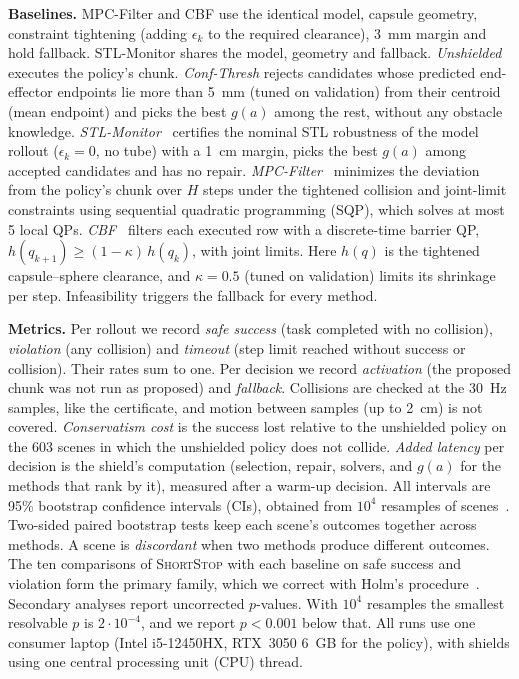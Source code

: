 \documentclass[runningheads]{llncs}
\newcommand{\sys}{\textsc{ShortStop}}
\begin{document}
\textbf{Baselines.} MPC-Filter and CBF use the identical model, capsule
geometry, constraint tightening (adding $\epsilon_k$ to the required
clearance), 3~mm margin and hold fallback.
STL-Monitor shares the model, geometry and fallback.
\emph{Unshielded} executes the policy's chunk. \emph{Conf-Thresh} rejects
candidates whose predicted end-effector endpoints lie more than 5~mm (tuned
on validation) from their centroid (mean endpoint) and picks the best $g(a)$
among the rest, without any obstacle knowledge.
\emph{STL-Monitor}~\cite{deshmukh2017robust} certifies the nominal STL
robustness of the model rollout ($\epsilon_k = 0$, no tube) with a 1~cm
margin, picks the best $g(a)$ among accepted candidates and has no repair.
\emph{MPC-Filter}~\cite{wabersich2021predictive} minimizes the deviation
from the policy's chunk over $H$ steps under the tightened collision and
joint-limit constraints using sequential quadratic programming (SQP),
which solves at most 5 local QPs. \emph{CBF}~\cite{ames2017cbfqp} filters each
executed row with a discrete-time barrier QP,
$h(q_{k+1}) \ge (1 - \kappa)\, h(q_k)$, with joint limits. Here $h(q)$ is the tightened capsule--sphere clearance, and $\kappa=0.5$
(tuned on validation) limits its shrinkage per step.
Infeasibility triggers the fallback for every method.

\textbf{Metrics.} Per rollout we record \emph{safe success} (task completed
with no collision), \emph{violation} (any collision) and \emph{timeout}
(step limit reached without success or collision). Their rates sum to one. Per decision we record \emph{activation} (the proposed chunk was not run as
proposed) and \emph{fallback}. Collisions are checked at the 30~Hz samples,
like the certificate, and motion between samples (up to 2~cm) is not
covered. \emph{Conservatism cost} is the success lost
relative to the unshielded policy on the 603 scenes in which the unshielded
policy does not collide. \emph{Added latency} per decision is the shield's
computation (selection, repair, solvers, and $g(a)$ for the methods that
rank by it), measured after a warm-up decision. All intervals are 95\%
bootstrap confidence intervals (CIs), obtained from $10^4$ resamples of
scenes~\cite{efron1994bootstrap}. Two-sided paired bootstrap tests keep
each scene's outcomes together across methods. A scene is
\emph{discordant} when two methods produce different outcomes.
The ten comparisons of \sys{} with each baseline on safe success and
violation form the primary family, which we correct with Holm's
procedure~\cite{holm1979simple}. Secondary analyses report uncorrected
$p$-values. With $10^4$ resamples the smallest resolvable $p$ is
$2 \cdot 10^{-4}$, and we report $p < 0.001$ below that.
All runs use one consumer laptop (Intel i5-12450HX, RTX~3050 6~GB for the
policy), with shields using one central processing unit (CPU) thread.
\end{document}
